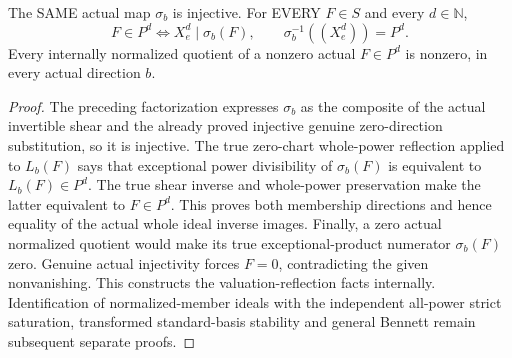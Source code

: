 \begin{theorem}
\label{hir:actual-formal-blowup-all-directions-whole-power-reflection}
The SAME actual map $\sigma_b$ is injective. For EVERY $F\in S$ and
every $d\in\mathbb N$,
\[
 F\in P^d\Longleftrightarrow X_e^d\mid\sigma_b(F),
 \qquad \sigma_b^{-1}((X_e^d))=P^d.
\]
Every internally normalized quotient of a nonzero actual $F\in P^d$
is nonzero, in every actual direction $b$.
\leanok
\end{theorem}
\begin{proof}
The preceding factorization expresses $\sigma_b$ as the composite of
the actual invertible shear and the already proved injective genuine
zero-direction substitution, so it is injective. The true zero-chart
whole-power reflection applied to $L_b(F)$ says that exceptional
power divisibility of $\sigma_b(F)$ is equivalent to $L_b(F)\in P^d$.
The true shear inverse and whole-power preservation make the latter
equivalent to $F\in P^d$. This proves both membership directions
and hence equality of the actual whole ideal inverse images.
Finally, a zero actual normalized quotient would make its true
exceptional-product numerator $\sigma_b(F)$ zero. Genuine actual
injectivity forces $F=0$, contradicting the given nonvanishing.
This constructs the valuation-reflection facts internally. Identification
of normalized-member ideals with the independent all-power strict
saturation, transformed standard-basis stability and general Bennett
remain subsequent separate proofs.
\end{proof}
